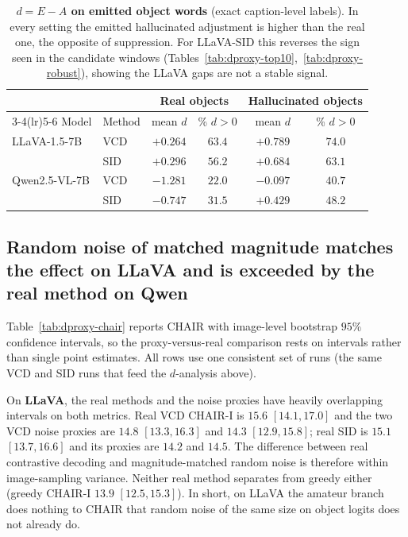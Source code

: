 \documentclass{article}
\begin{document}
\begin{table}[t]
\centering
\small
\setlength{\tabcolsep}{5pt}
\caption{\textbf{$d = E - A$ on emitted object words} (exact caption-level
labels). In every setting the emitted hallucinated adjustment is higher than the
real one, the opposite of suppression. For LLaVA-SID this reverses the sign seen
in the candidate windows (Tables~\ref{tab:dproxy-top10},~\ref{tab:dproxy-robust}),
showing the LLaVA gaps are not a stable signal.}
\label{tab:dproxy-emitted}
\begin{tabular}{ll cc cc}
\toprule
& & \multicolumn{2}{c}{Real objects} & \multicolumn{2}{c}{Hallucinated objects} \\
\cmidrule(lr){3-4}\cmidrule(lr){5-6}
Model & Method & mean $d$ & \% $d\!>\!0$ & mean $d$ & \% $d\!>\!0$ \\
\midrule
LLaVA-1.5-7B & VCD & $+0.264$ & $63.4$ & $+0.789$ & $74.0$ \\
 & SID & $+0.296$ & $56.2$ & $+0.684$ & $63.1$ \\
Qwen2.5-VL-7B & VCD & $-1.281$ & $22.0$ & $-0.097$ & $40.7$ \\
 & SID & $-0.747$ & $31.5$ & $+0.429$ & $48.2$ \\
\bottomrule
\end{tabular}
\end{table}

\subsection{Random noise of matched magnitude matches the effect on LLaVA and is exceeded by the real method on Qwen}
\label{subsec:dproxy-res-proxy}

Table~\ref{tab:dproxy-chair} reports CHAIR with image-level bootstrap $95\%$
confidence intervals, so the proxy-versus-real comparison rests on intervals
rather than single point estimates. All rows use one consistent set of runs (the
same VCD and SID runs that feed the $d$-analysis above).

On \textbf{LLaVA}, the real methods and the noise proxies have heavily
overlapping intervals on both metrics. Real VCD CHAIR-I is $15.6$ $[14.1, 17.0]$
and the two VCD noise proxies are $14.8$ $[13.3, 16.3]$ and $14.3$ $[12.9,
15.8]$; real SID is $15.1$ $[13.7, 16.6]$ and its proxies are $14.2$ and $14.5$.
The difference between real contrastive decoding and magnitude-matched random
noise is therefore within image-sampling variance. Neither real method separates
from greedy either (greedy CHAIR-I $13.9$ $[12.5, 15.3]$). In short, on LLaVA the
amateur branch does nothing to CHAIR that random noise of the same size on object
logits does not already do.
\end{document}
